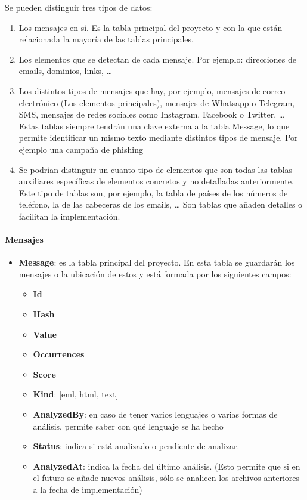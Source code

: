Se pueden distinguir tres tipos de datos: 

\begin{enumerate}
    \item Los mensajes en sí. Es la tabla principal del proyecto y con la que están relacionada la mayoría de las tablas principales.
    \item Los elementos que se detectan de cada mensaje. Por ejemplo: direcciones de emails, dominios, links, …
    \item Los distintos tipos de mensajes que hay, por ejemplo, mensajes de correo electrónico (Los elementos principales), mensajes de Whatsapp o Telegram, SMS, mensajes de redes sociales como Instagram, Facebook o Twitter, …
    Estas tablas siempre tendrán una clave externa a la tabla Message, lo que permite identificar un mismo texto mediante distintos tipos de mensaje. Por ejemplo una campaña de phishing 
    \item Se podrían distinguir un cuanto tipo de elementos que son todas las tablas auxiliares específicas de elementos concretos y no detalladas anteriormente. Este tipo de tablas son, por ejemplo, la tabla de países de los números de teléfono, la de las cabeceras de los emails, … Son tablas que añaden detalles o facilitan la implementación. 
    
\end{enumerate}

\paragraph{Mensajes}
\begin{itemize}
    \item \textbf{Message}: es la tabla principal del proyecto. En esta tabla se guardarán los mensajes o la ubicación de estos y está formada por los siguientes campos: 
\begin{itemize}
    \item \textbf{Id}
    \item \textbf{Hash}
    \item \textbf{Value}
    \item \textbf{Occurrences}
    \item \textbf{Score}
    \item \textbf{Kind}: [eml, html, text]
    \item \textbf{AnalyzedBy}: en caso de tener varios lenguajes o varias formas de análisis, permite saber con qué lenguaje se ha hecho
    \item \textbf{Status}: indica si está analizado o pendiente de analizar.
    \item \textbf{AnalyzedAt}: indica la fecha del último análisis. (Esto permite que si en el futuro se añade nuevos análisis, sólo se analicen los archivos anteriores a la fecha de implementación)
\end{itemize}
\end{itemize}
